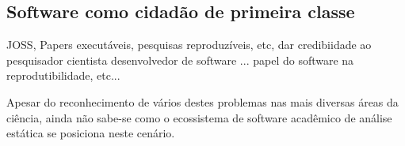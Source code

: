 \subsection{Software como cidadão de primeira classe}

JOSS, Papers executáveis, pesquisas reproduzíveis, etc, dar credibiidade ao
pesquisador cientista desenvolvedor de software ... papel do software na
reprodutibilidade, etc...

Apesar do reconhecimento de vários destes problemas nas mais diversas
áreas da ciência, ainda não sabe-se como o ecossistema de software
acadêmico de análise estática se posiciona neste cenário.




